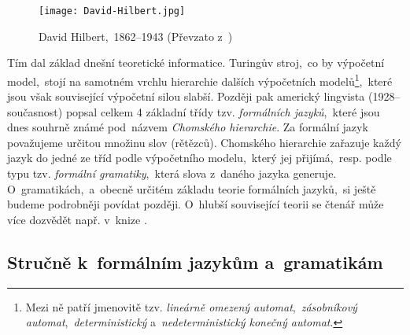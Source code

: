 \begin{figure}[h]
    \centering
    \texttt{[image: David-Hilbert.jpg]}
    \caption[David Hilbert,~1862--1943]{David Hilbert,~1862--1943 (Převzato z~\cite{OConnorHilbert2025})}
    \label{fig:david-hilbert}
\end{figure}
Tím dal základ dnešní teoretické informatice. Turingův stroj,~co by výpočetní model,~stojí na samotném vrchlu hierarchie dalších výpočetních modelů\footnote{Mezi ně patří jmenovitě tzv. \textit{lineárně omezený automat},~\emph{zásobníkový automat},~\emph{deterministický} a~\emph{nedeterministický konečný automat}.},~které jsou však související výpočetní silou slabší.  Později pak americký lingvista  (1928--současnost) popsal celkem 4 základní třídy tzv. \emph{formálních jazyků},~které jsou dnes souhrně známé pod~názvem \emph{Chomského hierarchie}. Za formální jazyk považujeme určitou množinu slov (rětězců). Chomského hierarchie zařazuje každý jazyk do jedné ze tříd podle výpočetního modelu,~který jej přijímá,~resp. podle typu tzv. \emph{formální gramatiky},~která slova z~daného jazyka generuje. O~gramatikách,~a~obecně určitém základu teorie formálních jazyků,~si ještě budeme podrobněji povídat později. O~hlubší související teorii se čtenář může více dozvědět např. v~knize \cite{Motwani2003}.

\subsection{Stručně k~formálním jazykům a~gramatikám}\label{subsec:formalni-jazyky-a-gramatiky}

